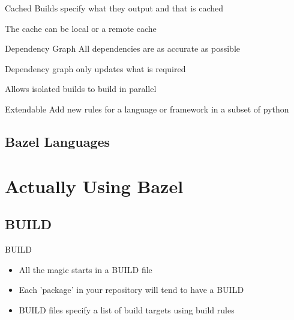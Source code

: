 \documentclass[aspectratio=169]{beamer}
\begin{document}
\begin{body-slide}{Cached}
Builds specify what they output and that is cached

The cache can be local or a remote cache
\end{body-slide}

\begin{body-slide}{Dependency Graph}
All dependencies are as accurate as possible

Dependency graph only updates what is required

Allows isolated builds to build in parallel
\end{body-slide}

\begin{body-slide}{Extendable}
Add new rules for a language or framework in a subset of python
\end{body-slide}

\subsection{Bazel Languages}
{
\begin{frame}
    
\end{frame}
}


\section{Actually Using Bazel}

\subsection{BUILD}

\begin{body-slide}{BUILD}
\begin{itemize}[<+-|alert@+>] 
    \color{UQCSBlue}
    \item All the magic starts in a BUILD file
    \item Each 'package' in your repository will tend to have a BUILD
    \item BUILD files specify a list of build targets using build rules
\end{itemize}
\end{body-slide}
\end{document}
